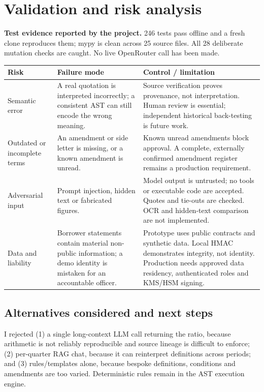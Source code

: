 \documentclass[10pt,letterpaper]{article}
\newcommand{\tabsize}{\footnotesize}
\begin{document}
\section{Validation and risk analysis}
\textbf{Test evidence reported by the project.} 246 tests pass offline and a fresh clone reproduces them; mypy is clean across 25 source files. All 28 deliberate mutation checks are caught. No live OpenRouter call has been made.

\smallskip
\begin{tabularx}{\linewidth}{@{}L{1.9cm} Y Y@{}}
\toprule
\tabsize\textbf{Risk} & \tabsize\textbf{Failure mode} & \tabsize\textbf{Control / limitation} \\
\midrule
\tabsize Semantic error & \tabsize A real quotation is interpreted incorrectly; a consistent AST can still encode the wrong meaning. & \tabsize Source verification proves provenance, not interpretation. Human review is essential; independent historical back-testing is future work. \\
\tabsize Outdated or incomplete terms & \tabsize An amendment or side letter is missing, or a known amendment is unread. & \tabsize Known unread amendments block approval. A complete, externally confirmed amendment register remains a production requirement. \\
\tabsize Adversarial input & \tabsize Prompt injection, hidden text or fabricated figures. & \tabsize Model output is untrusted; no tools or executable code are accepted. Quotes and tie-outs are checked. OCR and hidden-text comparison are not implemented. \\
\tabsize Data and liability & \tabsize Borrower statements contain material non-public information; a demo identity is mistaken for an accountable officer. & \tabsize Prototype uses public contracts and synthetic data. Local HMAC demonstrates integrity, not identity. Production needs approved data residency, authenticated roles and KMS/HSM signing. \\
\bottomrule
\end{tabularx}

\subsection{Alternatives considered and next steps}
I rejected (1) a single long-context LLM call returning the ratio, because arithmetic is not reliably reproducible and source lineage is difficult to enforce; (2) per-quarter RAG chat, because it can reinterpret definitions across periods; and (3) rules/templates alone, because bespoke definitions, conditions and amendments are too varied. Deterministic rules remain in the AST execution engine.
\end{document}
